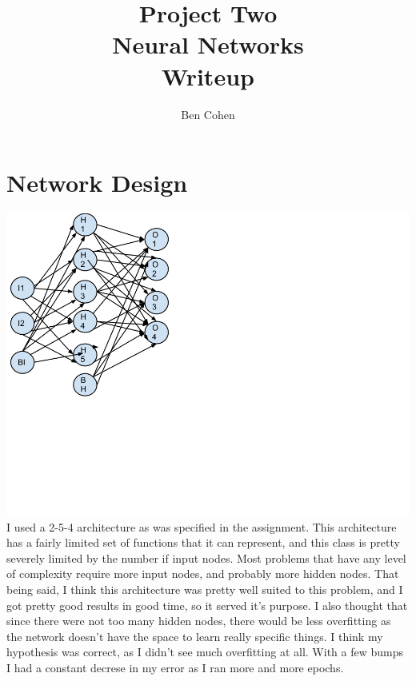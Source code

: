 \documentclass{book}
\title{Project Two \\Neural Networks \\ Writeup}
\author{Ben Cohen}
\begin{document}
\maketitle
\section*{Network Design}
\includegraphics[scale=0.5]{arch.png}
\indent I used a 2-5-4 architecture as was specified in the assignment.  This architecture has a fairly limited set of functions that it can represent, and this class is pretty severely limited by the number if input nodes.  Most problems that have any level of complexity require more input nodes, and probably more hidden nodes.  That being said, I think this architecture was pretty well suited to this problem, and I got pretty good results in good time, so it served it's purpose.  I also thought that since there were not too many hidden nodes, there would be less overfitting as the network doesn't have the space to learn really specific things.  I think my hypothesis was correct, as I didn't see much overfitting at all.  With a few bumps I had a constant decrese in my error as I ran more and more epochs.  
\end{document}
